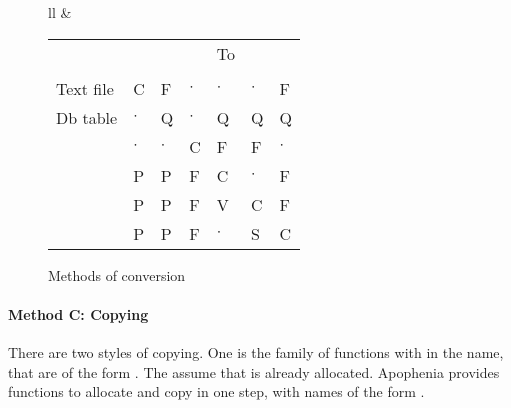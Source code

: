 \def\rcap#1{\rotatebox{45}{#1}\hskip -15pt }
\def\rcapc#1{\rotatebox{45}{\cinline{#1}}\hskip -15pt }
\def\cd{$\cdot$}
\begin{figure} \begin{center}
\begin{tabular}{ll}
&
\begin{tabular}{lp{0.4cm}p{0.4cm}p{0.4cm}p{0.4cm}p{0.4cm}p{0.4cm}}
   &   &&&To\\
    & \rcap{Text file} & \rcap{Db table} & \rcapc{double[]} 
        & \rcapc{gsl\_vector} & \rcapc{gsl\_matrix}& \rcapc{apop\_data}\\
Text file               & C & F & \cd & \cd & \cd &  F                   \\
Db table                & \cd & Q & \cd & Q & Q & Q                  \\
\cinline{double[ ]}      & \cd & \cd & C & F & F & \cd                  \\
\cinline{gsl\_vector}   & P  & P & F & C & \cd & F                    \\
\cinline{gsl\_matrix}   &  P & P & F & V &C &  F               \\
\cinline{apop\_data}    & P & P & F & \cd & S &C
\end{tabular}
\end{tabular}
\caption{Methods of conversion} \label{conversiontab}
\end{center}\end{figure} 


\paragraph{Method C: Copying} There are two styles of copying.
One is the family of functions with  in the name, that are
of the form . The assume that 
is already allocated.  
Apophenia provides functions to allocate and copy in one step, with
names of the form .

